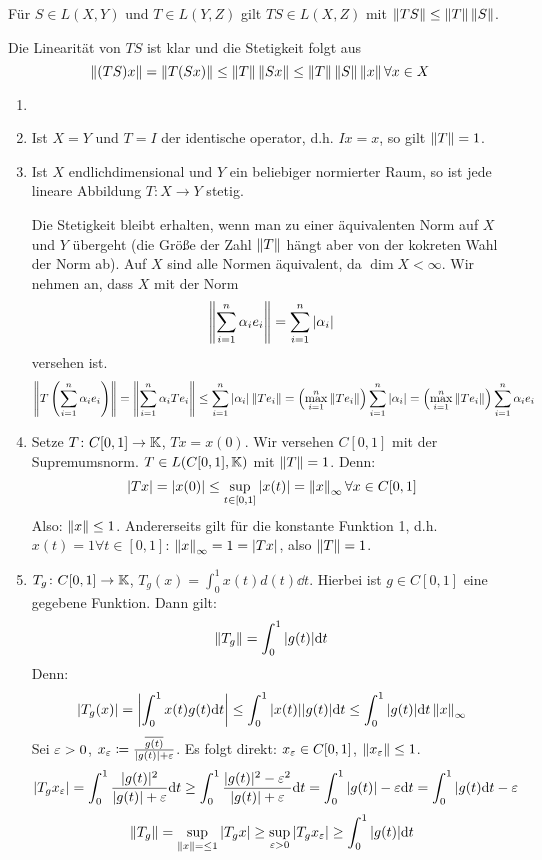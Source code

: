 \newpage
\begin{lemma}
	F\"ur $ S\in L(X,Y) $ und $ T\in L(Y,Z) $ gilt $ TS\in L(X,Z) $ mit $ \left\|TS\right\|\leq\left\|T\right\|\left\|S\right\| $.
\end{lemma}
\begin{beweis}
	Die Linearit\"at von $ TS $ ist klar und die Stetigkeit folgt aus
	\[ \left\|(TS)x\right\|=\left\|T(Sx)\right\|\leq\left\|T\right\|\left\|Sx\right\|\leq\left\|T\right\|\left\|S\right\|\left\|x\right\|\forall x\in X \]
\end{beweis}
\begin{beispiel*}
	\begin{enumerate}
		\item[]
		\item Ist $ X=Y $ und $ T=I $ der identische operator, d.h. $ Ix=x $, so gilt $ \left\|T\right\|=1 $.
		\item Ist $ X $ endlichdimensional und $ Y $ ein beliebiger normierter Raum, so ist jede lineare Abbildung $ T\colon X\rightarrow Y $ stetig.
		\begin{beweis}
			Die Stetigkeit bleibt erhalten, wenn man zu einer \"aquivalenten Norm auf $ X $ und $ Y $ \"ubergeht (die Gr\"o\ss e der Zahl $ \left\|T\right\| $ h\"angt aber von der kokreten Wahl der Norm ab). Auf $ X $ sind alle Normen \"aquivalent, da $ \dim X<\infty $. Wir nehmen an, dass $ X $ mit der Norm \[ \left\|\sum_{i=1}^{n}\alpha_i e_i\right\|=\sum_{i=1}^n |\alpha_i| \]
			versehen ist. 
			\[ \left\|T\left(\sum_{i=1}^n\alpha_i e_i\right)\right\|=\left\|\sum_{i=1}^n\alpha_i Te_i\right\|\leq\sum_{i=1}^{n}|\alpha_i|\left\|Te_i\right\|=\left(\max_{i=1}^n\left\|Te_i\right\|\right)\sum_{i=1}^{n}|\alpha_i|=\left(\max_{i=1}^n\left\|Te_i\right\|\right)\sum_{i=1}^{n}\alpha_ie_i \]
		\end{beweis}
		\item Setze $ T\colon C[0,1]\rightarrow\mathbb{K} $, $ Tx=x(0) $. Wir versehen $ C[0,1] $ mit der Supremumsnorm. $ T\in L(C[0,1],\mathbb{K}) $ mit $ \left\|T\right\|=1 $. Denn:
		\[ |Tx|=|x(0)|\leq\sup_{t\in[0,1]}|x(t)|=\left\|x\right\|_\infty\forall x\in C[0,1] \]
		Also: $ \left\|x\right\|\leq 1 $. Andererseits gilt f\"ur die konstante Funktion 1, d.h. $ x(t)=1\forall t\in[0,1] $: $ \left\|x\right\|_\infty=1=|Tx| $, also $ \left\|T\right\|=1 $.
		\item $ T_g\colon C[0,1]\rightarrow\mathbb{K} $, $ T_g(x)=\int_0^1 x(t)d(t)\dd t $. Hierbei ist $ g\in C[0,1] $ eine gegebene Funktion. Dann gilt:
		\[ \left\|T_g\right\|=\int_0^1|g(t)|\mathrm d t \]
		Denn:
		\[ |T_g(x)|=\left|\int_0^1 x(t)g(t)\mathrm d t\right|\leq\int_0^1|x(t)||g(t)|\mathrm d t\leq\int_0^1|g(t)|\mathrm d t\left\|x\right\|_\infty \]
		Sei $ \varepsilon>0 $, $ x_\varepsilon\coloneqq\frac{\overline{g(t)}}{|g(t)|+\varepsilon} $. Es folgt direkt: $ x_\varepsilon\in C[0,1] $, $ \left\|x_\varepsilon\right\|\leq 1 $.
		\[ |T_gx_\varepsilon|=\int_0^1\frac{|g(t)|^2}{|g(t)|+\varepsilon}\mathrm d t\geq\int_0^1\frac{|g(t)|^2-\varepsilon^2}{|g(t)|+\varepsilon}\mathrm d t=\int_0^1|g(t)|-\varepsilon\mathrm d t=\int_0^1|g(t)\mathrm d t-\varepsilon  \]
		\[ \left\|T_g\right\|=\sup_{\left\|x\right\|=\leq 1}|T_gx|\geq \sup_{\varepsilon>0}|T_gx_\varepsilon|\geq\int_0^1|g(t)|\mathrm d t \]
	\end{enumerate}
\end{beispiel*}
